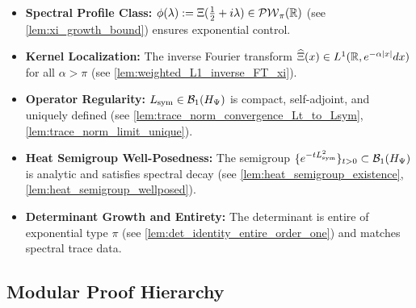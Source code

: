\begin{itemize}
  \item \textbf{Spectral Profile Class:} \( \phi(\lambda) := \Xi(\tfrac{1}{2} + i\lambda) \in \mathcal{PW}_{\pi}(\mathbb{R}) \) (see \cref{lem:xi_growth_bound}) ensures exponential control.

  \item \textbf{Kernel Localization:} The inverse Fourier transform \( \widehat{\Xi}(x) \in L^1(\mathbb{R}, e^{-\alpha |x|} dx) \) for all \( \alpha > \pi \) (see \cref{lem:weighted_L1_inverse_FT_xi}).

  \item \textbf{Operator Regularity:} \( L_{\mathrm{sym}} \in \mathcal{B}_1(H_{\Psi}) \) is compact, self-adjoint, and uniquely defined (see \cref{lem:trace_norm_convergence_Lt_to_Lsym}, \cref{lem:trace_norm_limit_unique}).

  \item \textbf{Heat Semigroup Well-Posedness:} The semigroup \( \{ e^{-tL_{\mathrm{sym}}^2} \}_{t > 0} \subset \mathcal{B}_1(H_{\Psi}) \) is analytic and satisfies spectral decay (see \cref{lem:heat_semigroup_existence}, \cref{lem:heat_semigroup_wellposed}).

  \item \textbf{Determinant Growth and Entirety:} The determinant is entire of exponential type \( \pi \) (see \cref{lem:det_identity_entire_order_one}) and matches spectral trace data.
\end{itemize}

\subsection*{Modular Proof Hierarchy}

